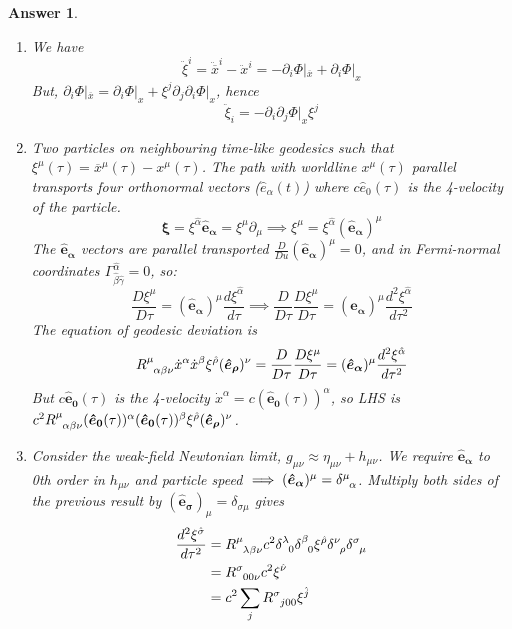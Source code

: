 \documentclass[a4paper]{article}
\theoremstyle{new2}
\newtheorem{ans}{Answer}[section]
\theoremstyle{new}
\begin{document}
\begin{ans}\leavevmode
\begin{enumerate}[label=(\alph*)]
\item We have
$$\ddot{\xi}^i=\ddot{\overline{x}}^i-\ddot{x}^i=-\partial_i\Phi|_{\overline{x}}+\partial_i\Phi|_x$$
But, $\partial_i\Phi|_{\overline{x}}=\partial_i\Phi|_x+\xi^j\partial_j\partial_i\Phi|_x$, hence
$$\ddot{\xi}_i=-\partial_i\partial_j\Phi|_x\xi^j$$
\item Two particles on neighbouring time-like geodesics such that $\xi^\mu(\tau)=\overline{x}^\mu(\tau)-x^\mu(\tau)$. The path with worldline $x^\mu(\tau)$ parallel transports four orthonormal vectors ($\hat{e}_\alpha(t)$) where $c\hat{e}_0(\tau)$ is the 4-velocity of the particle.
$$\boldsymbol{\xi}=\xi^{\hat{\alpha}}\boldsymbol{\hat{e}_\alpha}=\xi^\mu\partial_\mu\implies\xi^\mu=\xi^{\hat{\alpha}}(\boldsymbol{\hat{e}_\alpha})^\mu$$
The $\boldsymbol{\hat{e}_\alpha}$ vectors are parallel transported $\frac{D}{Du}(\boldsymbol{\hat{e}_\alpha})^\mu=0$, and in Fermi-normal coordinates $\Gamma^{\hat{\alpha}}_{\hat{\beta}\hat{\gamma}}=0$, so:
$$\frac{D\xi^\mu}{D\tau}=(\boldsymbol{\hat{e}_\alpha})^\mu\frac{d\xi^{\hat{\alpha}}}{d\tau}\implies\frac{D}{D\tau}\frac{D\xi^\mu}{D\tau}=(\boldsymbol{\hat{e}_\alpha})^\mu\frac{d^2\xi^{\hat{\alpha}}}{d\tau^2}$$
The equation of geodesic deviation is
$$\tensor*{R}{*_{}^{\mu}_{\alpha\beta\nu}}\dot{x}^\alpha\dot{x}^\beta\xi^{\hat{\rho}}(\boldsymbol{\hat{e}_\rho})^\nu=\frac{D}{D\tau}\frac{D\xi^\mu}{D\tau}=(\boldsymbol{\hat{e}_\alpha})^\mu\frac{d^2\xi^{\hat{\alpha}}}{d\tau^2}$$
But $c\boldsymbol{\hat{e}_0}(\tau)$ is the 4-velocity $\dot{x}^\alpha=c(\boldsymbol{\hat{e}_0}(\tau))^\alpha$, so LHS is $c^2\tensor*{R}{*_{}^{\mu}_{\alpha\beta\nu}}(\boldsymbol{\hat{e}_0}(\tau))^\alpha(\boldsymbol{\hat{e}_0}(\tau))^\beta\xi^{\hat{\rho}}(\boldsymbol{\hat{e}_\rho})^\nu$.
\item Consider the weak-field Newtonian limit, $g_{\mu\nu}\approx\eta_{\mu\nu}+h_{\mu\nu}$. We require $\boldsymbol{\hat{e}_\alpha}$ to 0th order in $h_{\mu\nu}$ and particle speed $\implies(\boldsymbol{\hat{e}_\alpha})^\mu=\tensor*{\delta}{*_{}^{\mu}_{\alpha}}$. Multiply both sides of the previous result by $(\boldsymbol{\hat{e}_\sigma})_\mu=\delta_{\sigma\mu}$ gives
\begin{align}
    \frac{d^2\xi^{\hat{\sigma}}}{d\tau^2}&=\tensor*{R}{*_{}^{\mu}_{\lambda\beta\nu}}c^2\tensor*{\delta}{*_{}^{\lambda}_{0}}\tensor*{\delta}{*_{}^{\beta}_{0}}\xi^{\hat{\rho}}\tensor*{\delta}{*_{}^{\nu}_{\rho}}\tensor*{\delta}{*_{}^{\sigma}_{\mu}}\nonumber\\&=\tensor*{R}{*_{}^{\sigma}_{00\nu}}c^2\xi^{\hat{\nu}}\nonumber\\&=c^2\sum_j\tensor*{R}{*_{}^{\sigma}_{j00}}\xi^{\hat{j}}\nonumber

\end{align}
\end{enumerate}
\end{ans}
\end{document}
